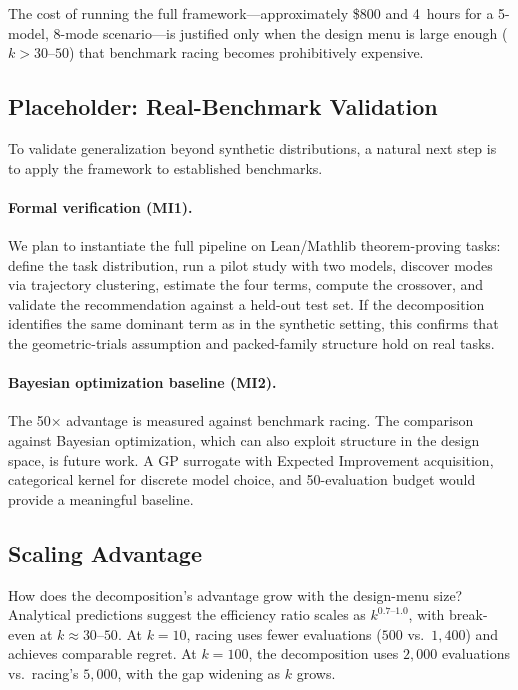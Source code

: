 \documentclass[twoside,11pt]{article}
\begin{document}
The cost of running the full framework---approximately \$800 and 4~hours for a 5-model, 8-mode scenario---is justified only when the design menu is large enough ($k > 30\text{--}50$) that benchmark racing becomes prohibitively expensive.

\subsection{Placeholder: Real-Benchmark Validation}
\label{sec:real-benchmarks}

To validate generalization beyond synthetic distributions, a natural next step is to apply the framework to established benchmarks.

\paragraph{Formal verification (MI1).}
We plan to instantiate the full pipeline on Lean/Mathlib theorem-proving tasks: define the task distribution, run a pilot study with two models, discover modes via trajectory clustering, estimate the four terms, compute the crossover, and validate the recommendation against a held-out test set.
If the decomposition identifies the same dominant term as in the synthetic setting, this confirms that the geometric-trials assumption and packed-family structure hold on real tasks.

\paragraph{Bayesian optimization baseline (MI2).}
The 50$\times$ advantage is measured against benchmark racing.
The comparison against Bayesian optimization, which can also exploit structure in the design space, is future work.
A GP surrogate with Expected Improvement acquisition, categorical kernel for discrete model choice, and 50-evaluation budget would provide a meaningful baseline.

\subsection{Scaling Advantage}
\label{sec:scaling}

How does the decomposition's advantage grow with the design-menu size?
Analytical predictions suggest the efficiency ratio scales as $k^{0.7\text{--}1.0}$, with break-even at $k \approx 30\text{--}50$.
At $k = 10$, racing uses fewer evaluations ($500$ vs.\ $1{,}400$) and achieves comparable regret.
At $k = 100$, the decomposition uses $2{,}000$ evaluations vs.\ racing's $5{,}000$, with the gap widening as $k$ grows.
\end{document}
